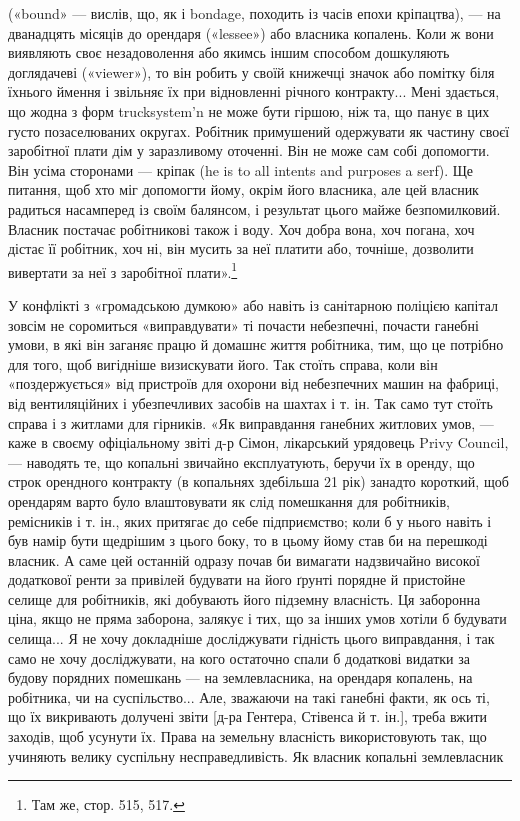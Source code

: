 \parcont{}  %
(«bound» — вислів, що, як і bondage, походить із часів епохи
кріпацтва), — на дванадцять місяців до орендаря («lessee») або
власника копалень. Коли ж вони виявляють своє незадоволення
або якимсь іншим способом дошкуляють доглядачеві («viewer»),
то він робить у своїй книжечці значок або помітку біля їхнього
ймення і звільняє їх при відновленні річного контракту... Мені
здається, що жодна з форм trucksystem’n не може бути гіршою,
ніж та, що панує в цих густо позаселюваних округах. Робітник
примушений одержувати як частину своєї заробітної плати дім
у заразливому оточенні. Він не може сам собі допомогти. Він
усіма сторонами — кріпак (he is to all intents and purposes a
serf). Ще питання, щоб хто міг допомогти йому, окрім його власника,
але цей власник радиться насамперед із своїм балянсом,
і результат цього майже безпомилковий. Власник постачає робітникові
також і воду. Хоч добра вона, хоч погана, хоч дістає
її робітник, хоч ні, він мусить за неї платити або, точніше, дозволити
вивертати за неї з заробітної плати».\footnote{
Там же, стор. 515, 517.
}

У конфлікті з «громадською думкою» або навіть із санітарною
поліцією капітал зовсім не соромиться «виправдувати»
ті почасти небезпечні, почасти ганебні умови, в які він заганяє
працю й домашнє життя робітника, тим, що це потрібно для того,
щоб вигідніше визискувати його. Так стоїть справа, коли він
«поздержується» від пристроїв для охорони від небезпечних машин
на фабриці, від вентиляційних і убезпечливих засобів на шахтах
і т. ін. Так само тут стоїть справа і з житлами для гірників. «Як
виправдання ганебних житлових умов, — каже в своєму офіціальному
звіті д-р Сімон, лікарський урядовець Privy Council, —
наводять те, що копальні звичайно експлуатують, беручи їх в
оренду, що строк орендного контракту (в копальнях здебільша
21 рік) занадто короткий, щоб орендарям варто було влаштовувати
як слід помешкання для робітників, ремісників і т. ін.,
яких притягає до себе підприємство; коли б у нього навіть і був
намір бути щедрішим з цього боку, то в цьому йому став би на
перешкоді власник. А саме цей останній одразу почав би вимагати
надзвичайно високої додаткової ренти за привілей будувати
на його ґрунті порядне й пристойне селище для робітників,
які добувають його підземну власність. Ця заборонна ціна, якщо
не пряма заборона, залякує і тих, що за інших умов хотіли б
будувати селища... Я не хочу докладніше досліджувати гідність
цього виправдання, і так само не хочу досліджувати, на кого
остаточно спали б додаткові видатки за будову порядних помешкань
— на землевласника, на орендаря копалень, на робітника,
чи на суспільство... Але, зважаючи на такі ганебні факти, як
ось ті, що їх викривають долучені звіти [д-ра Гентера, Стівенса
й т. ін.], треба вжити заходів, щоб усунути їх. Права
на земельну власність використовують так, що учиняють велику
суспільну несправедливість. Як власник копальні землевласник
\parbreak{}  %
